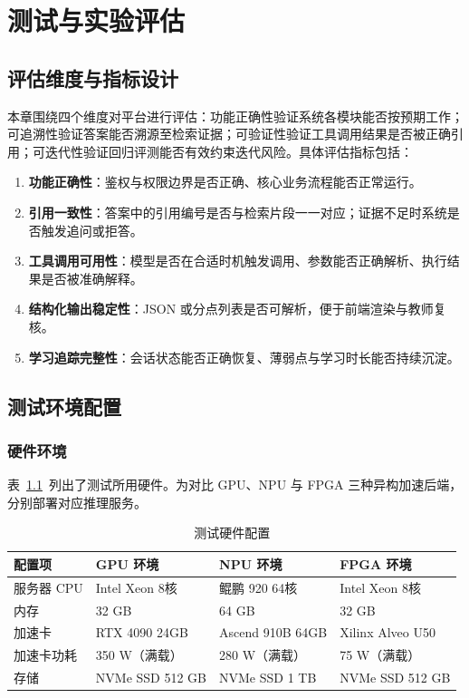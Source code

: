 \chapter{测试与实验评估}

\section{评估维度与指标设计}
本章围绕四个维度对平台进行评估：功能正确性验证系统各模块能否按预期工作；可追溯性验证答案能否溯源至检索证据；可验证性验证工具调用结果是否被正确引用；可迭代性验证回归评测能否有效约束迭代风险。具体评估指标包括：
\begin{enumerate}[label=(\arabic*)]
  \item \textbf{功能正确性}：鉴权与权限边界是否正确、核心业务流程能否正常运行。
  \item \textbf{引用一致性}：答案中的引用编号是否与检索片段一一对应；证据不足时系统是否触发追问或拒答。
  \item \textbf{工具调用可用性}：模型是否在合适时机触发调用、参数能否正确解析、执行结果是否被准确解释。
  \item \textbf{结构化输出稳定性}：JSON 或分点列表是否可解析，便于前端渲染与教师复核。
  \item \textbf{学习追踪完整性}：会话状态能否正确恢复、薄弱点与学习时长能否持续沉淀。
\end{enumerate}

\section{测试环境配置}

\subsection{硬件环境}
表~\ref{tab:hw-env}~列出了测试所用硬件。为对比 GPU、NPU 与 FPGA 三种异构加速后端，分别部署对应推理服务。

\begin{table}[htbp]
  \centering
  \caption{测试硬件配置}
  \label{tab:hw-env}
  \begin{tabular}{llll}
    \toprule
    配置项 & GPU 环境 & NPU 环境 & FPGA 环境 \\
    \midrule
    服务器 CPU & Intel Xeon 8核 & 鲲鹏 920 64核 & Intel Xeon 8核 \\
    内存 & 32 GB & 64 GB & 32 GB \\
    加速卡 & RTX 4090 24GB & Ascend 910B 64GB & Xilinx Alveo U50 \\
    加速卡功耗 & 350 W（满载） & 280 W（满载） & 75 W（满载） \\
    存储 & NVMe SSD 512 GB & NVMe SSD 1 TB & NVMe SSD 512 GB \\
    \bottomrule
  \end{tabular}
\end{table}

